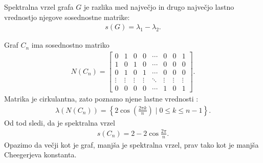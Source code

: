 \begin{definicija}
    Spektralna vrzel grafa \(G\) je razlika med največjo in drugo največjo lastno vrednostjo njegove sosednostne matrike:
    \begin{align*}
        s(G) = \lambda_1 - \lambda_2.
    \end{align*}
\end{definicija}
\begin{primer}[Cikli]
    Graf \(C_n\) ima sosednostno matriko
    \begin{align*}
        N(C_n) = \begin{bmatrix}
                     0      & 1      & 0      & 0      & \cdots & 0      & 0      & 1      \\
                     1      & 0      & 1      & 0      & \cdots & 0      & 0      & 0      \\
                     0      & 1      & 0      & 1      & \cdots & 0      & 0      & 0      \\
                     \vdots & \vdots & \vdots & \vdots & \ddots & \vdots & \vdots & \vdots \\
                     0      & 0      & 0      & 0      & \cdots & 1      & 0      & 1
                 \end{bmatrix}.
    \end{align*}
    Matrika je cirkulantna, zato poznamo njene lastne vrednosti \cite{circulant}:
    \begin{align*}
        \lambda(N(C_n)) = \left\{ 2 \cos\left(\frac{2\pi k}{n}\right) \mid 0 \leq k \leq n-1\right\}.
    \end{align*}
    Od tod sledi, da je spektralna vrzel
    \begin{align*}
        s(C_n) = 2 - 2\cos\frac{2\pi}{n}.
    \end{align*}
    Opazimo da večji kot je graf, manjša je spektralna vrzel, prav tako kot je manjša Cheegerjeva konstanta.
\end{primer}
